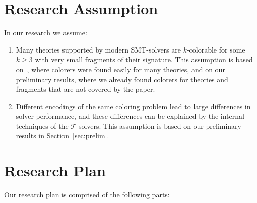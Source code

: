 \documentclass[12pt,a4paper]{article}
\newcommand{\T}{\mathcal{T}}
\theoremstyle{definition}
\begin{document}
\section{Research Assumption}

In our research we assume:
\begin{enumerate}
  \item Many theories supported by modern SMT-solvers are $k$-colorable for some
    $k \geq 3$ with very small fragments of their signature. This assumption is
    based on~\cite{Sebastiani16}, where colorers were found easily for many
    theories, and on our preliminary results, where we already found colorers for
    theories and fragments that are not covered by the paper.
  \item Different encodings of the same coloring problem lead to large differences
    in solver performance, and these differences can be explained by the internal
    techniques of the $\T$-solvers. This assumption is based on our preliminary
    results in Section~\ref{sec:prelim}.
\end{enumerate}

\section{Research Plan}

Our research plan is comprised of the following parts:
\end{document}
